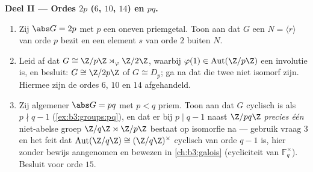 \begin{problem}
\medskip
\noindent\textbf{Deel II --- Ordes $2p$ ($6$, $10$, $14$) en
$pq$.}
\begin{enumerate}[resume]
  \item Zij $\abs G = 2p$ met $p$ een oneven priemgetal. Toon aan
        dat $G$ een  $N = \langle r \rangle$ van orde
        $p$ bezit en een element $s$ van orde $2$ buiten $N$.
  \item Leid af dat $G \cong \Z/p\Z \rtimes_\varphi \Z/2\Z$, waarbij
        $\varphi(1) \in \operatorname{Aut}(\Z/p\Z)$ een involutie
        is, en besluit: $G \cong \Z/2p\Z$ of $G \cong D_p$; ga na
        dat die twee niet isomorf zijn. Hiermee zijn de ordes $6$,
        $10$ en $14$ afgehandeld.
  \item Zij algemener $\abs G = pq$ met $p < q$ priem. Toon aan dat
        $G$ cyclisch is als $p \nmid q-1$ (\cref{ex:b3:groups:pq}),
        en dat er bij $p \mid q - 1$ naast $\Z/pq\Z$ \emph{precies
        één} niet-abelse groep $\Z/q\Z \rtimes \Z/p\Z$ bestaat op
        isomorfie na --- gebruik vraag 3 en het feit dat
        $\operatorname{Aut}(\Z/q\Z) \cong (\Z/q\Z)^\times$ cyclisch
        van orde $q - 1$ is, hier zonder bewijs aangenomen en
        bewezen in \cref{ch:b3:galois} (cycliciteit van $\mathbb
        F_q^\times$). Besluit voor orde $15$.
\end{enumerate}


\end{problem}
